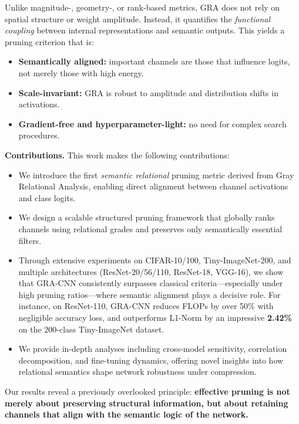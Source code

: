 \documentclass[sn-mathphys,Numbered]{sn-jnl}
\begin{document}
Unlike magnitude-, geometry-, or rank-based metrics, GRA does not rely on spatial structure or weight amplitude. Instead, it quantifies the \emph{functional coupling} between internal representations and semantic outputs. This yields a pruning criterion that is:
\begin{itemize}
    \item \textbf{Semantically aligned:} important channels are those that influence logits, not merely those with high energy.
    \item \textbf{Scale-invariant:} GRA is robust to amplitude and distribution shifts in activations.
    \item \textbf{Gradient-free and hyperparameter-light:} no need for complex search procedures.
\end{itemize}

\vspace{0.5em}
\noindent\textbf{Contributions.}  
This work makes the following contributions:
\begin{itemize}
    \item We introduce the first \emph{semantic relational} pruning metric derived from Gray Relational Analysis, enabling direct alignment between channel activations and class logits.
    \item We design a scalable structured pruning framework that globally ranks channels using relational grades and preserves only semantically essential filters.
    \item Through extensive experiments on CIFAR-10/100, Tiny-ImageNet-200, and multiple architectures (ResNet-20/56/110, ResNet-18, VGG-16), we show that GRA-CNN consistently surpasses classical criteria—especially under high pruning ratios—where semantic alignment plays a decisive role. For instance, on ResNet-110, GRA-CNN reduces FLOPs by over 50\% with negligible accuracy loss, and outperforms L1-Norm by an impressive \textbf{2.42\%} on the 200-class Tiny-ImageNet dataset.
    \item We provide in-depth analyses including cross-model sensitivity, correlation decomposition, and fine-tuning dynamics, offering novel insights into how relational semantics shape network robustness under compression.
\end{itemize}

Our results reveal a previously overlooked principle:  
\textbf{effective pruning is not merely about preserving structural information, but about retaining channels that align with the semantic logic of the network.}
\end{document}
